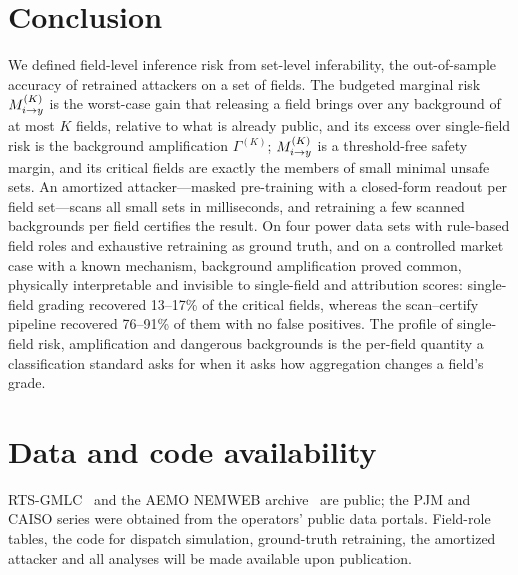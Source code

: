 \section{Conclusion}\label{sec:conclusion}

We defined field-level inference risk from set-level inferability, the out-of-sample accuracy of
retrained attackers on a set of fields. The budgeted marginal risk $M^{(K)}_{i \to y}$ is the worst-case gain
that releasing a field brings over any background of at most $K$ fields, relative to what is
already public, and its excess over single-field risk is the background amplification $\Gamma^{(K)}$;
$M^{(K)}_{i \to y}$ is a threshold-free safety margin, and its critical fields are exactly the
members of small minimal unsafe sets. An amortized attacker---masked pre-training with a
closed-form readout per field set---scans all small sets in milliseconds, and retraining a few
scanned backgrounds per field certifies the result. On four power data sets with rule-based field
roles and exhaustive retraining as ground truth, and on a controlled market case with a known
mechanism, background amplification proved common, physically interpretable and invisible to
single-field and attribution scores: single-field grading recovered 13--17\% of the critical fields,
whereas the scan--certify pipeline recovered 76--91\% of them with no false positives. The profile of
single-field risk, amplification and dangerous backgrounds is the per-field quantity a
classification standard asks for when it asks how aggregation changes a field's grade.

\section*{Data and code availability}
RTS-GMLC~\cite{barrows2020rts} and the AEMO NEMWEB archive~\cite{aemo2024nemweb} are public; the PJM and CAISO series
were obtained from the operators' public data portals. Field-role tables, the code for dispatch simulation, ground-truth
retraining, the amortized attacker and all analyses will be made available upon publication.
